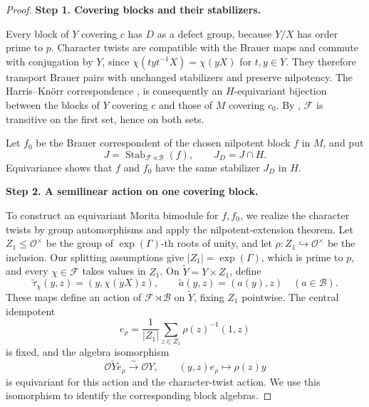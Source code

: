 \documentclass[11pt,a4paper]{article}
\theoremstyle{definition}
\theoremstyle{remark}
\numberwithin{equation}{section}
\newcommand{\cO}{\mathcal{O}}
\newcommand{\proofstep}[1]{%
	\par\addvspace{\medskipamount}%
	\noindent\textbf{#1}\par\nobreak
	\smallskip\nobreak\noindent\ignorespaces
}
\begin{document}
\begin{proof}
		\proofstep{Step 1. Covering blocks and their stabilizers.}
		Every block of $Y$ covering $c$ has $D$ as a defect group,
		because $Y/X$ has order prime to $p$.
		Character twists are compatible with the Brauer maps and commute
		with conjugation by $Y$, since
		$\chi(tyt^{-1}X)=\chi(yX)$ for $t,y\in Y$.
		They therefore transport Brauer pairs with unchanged stabilizers
		and preserve nilpotency.
		The Harris--Kn\"orr correspondence
		\cite[Theorem~9.28]{Navarro1998}, is consequently an
		$H$-equivariant bijection between the blocks of $Y$ covering $c$
		and those of $M$ covering $c_0$.
		By \cite[Lemma~2.2(a)]{KessarMalle2013}, $\mathcal F$ is transitive on the
		first set, hence on both sets.
		
		Let $f_0$ be the Brauer correspondent of the chosen nilpotent
		block $f$ in $M$, and put
		\[
		J=\operatorname{Stab}_{\mathcal F\rtimes\mathcal B}(f),
		\qquad J_D=J\cap H.
		\]
		Equivariance shows that $f$ and $f_0$ have the same stabilizer
		$J_D$ in $H$.
		
		\proofstep{Step 2. A semilinear action on one covering block.}
		To construct an equivariant Morita bimodule for $f,f_0$,
		we realize the character twists by group automorphisms
		and apply the nilpotent-extension theorem.
		Let $Z_1\leq\cO^\times$ be the group of $\exp(\Gamma)$-th roots
		of unity, and let $\rho:Z_1\hookrightarrow\cO^\times$ be the inclusion.
		Our splitting assumptions give $|Z_1|=\exp(\Gamma)$, which is
		prime to $p$, and every $\chi\in\mathcal F$ takes values in $Z_1$.
		On $\widetilde Y=Y\times Z_1$, define
		\[
		\widetilde\tau_\chi(y,z)=(y,\chi(yX)z),\qquad
		\widetilde a(y,z)=(a(y),z)\quad(a\in\mathcal B).
		\]
		These maps define an action of $\mathcal F\rtimes\mathcal B$
		on $\widetilde Y$, fixing $Z_1$ pointwise.
		The central idempotent
		\[
		e_\rho=\frac1{|Z_1|}\sum_{z\in Z_1}\rho(z)^{-1}(1,z)
		\]
		is fixed, and the algebra isomorphism
		\[
		\cO\widetilde Y e_\rho\xrightarrow{\sim}\cO Y,\qquad
		(y,z)e_\rho\longmapsto\rho(z)y
		\]
		is equivariant for this action and the character-twist action.
		We use this isomorphism to identify the corresponding block algebras.
		

\end{proof}
\end{document}
